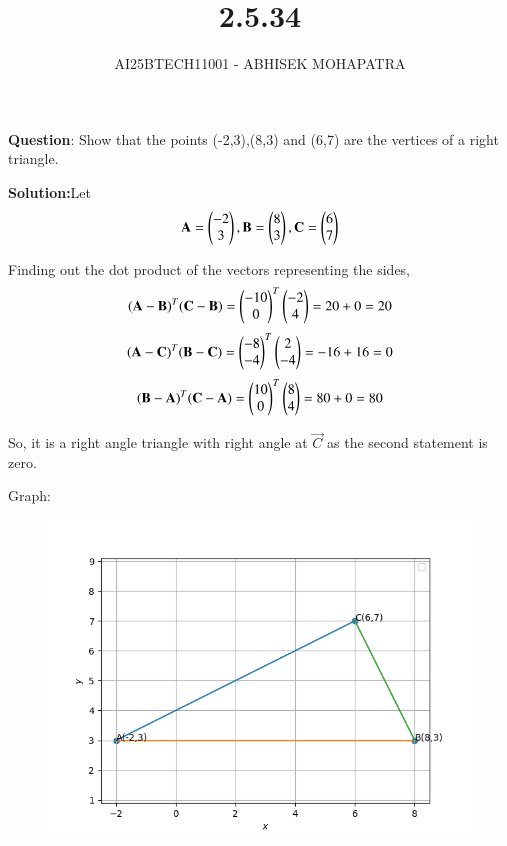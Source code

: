 \documentclass[journal,12pt,onecolumn]{IEEEtran}
\begin{document}
\title{2.5.34}
\author{AI25BTECH11001 - ABHISEK MOHAPATRA}
{\let\newpage\relax\maketitle}
	 	\textbf{Question}:
		Show that the points (-2,3),(8,3) and (6,7) are the vertices of a right triangle.

		\textbf{Solution:}Let 
		\begin{align}
			\mathbf{A} = \begin{pmatrix}-2\\3\end{pmatrix}, \mathbf{B} = \begin{pmatrix}8\\3\end{pmatrix}, \mathbf{C} = \begin{pmatrix}6\\7\end{pmatrix}
		\end{align}
		
		Finding out the dot product of the vectors representing the sides,
		\begin{align}
			(\mathbf{A}-\mathbf{B})^T(\mathbf{C}-\mathbf{B}) = \begin{pmatrix}-10\\0\end{pmatrix}^T\begin{pmatrix}-2\\4\end{pmatrix} = 20 + 0 = 20
		\end{align}
		\begin{align}
			(\mathbf{A}-\mathbf{C})^T(\mathbf{B}-\mathbf{C}) = \begin{pmatrix}-8\\-4\end{pmatrix}^T\begin{pmatrix}2\\-4\end{pmatrix} = -16 + 16 = 0
		\end{align}
		\begin{align}
			(\mathbf{B}-\mathbf{A})^T(\mathbf{C}-\mathbf{A}) = \begin{pmatrix}10\\0\end{pmatrix}^T\begin{pmatrix}8\\4\end{pmatrix} = 80 + 0 = 80 
		\end{align}

		So, it is a right angle triangle with right angle at $\vec{C}$ as the second statement is zero. 
	
	Graph:
\begin{figure}[h!]
	\centering
	\includegraphics[width=0.7\linewidth]{img.png}
\end{figure}
\end{document}
